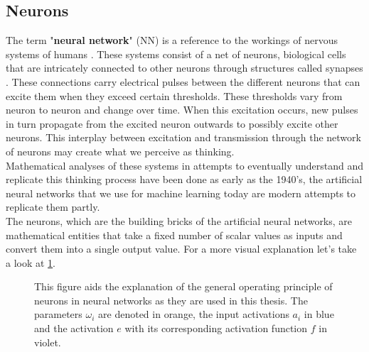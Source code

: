 \subsection{Neurons}
The term "\textbf{neural network}" (NN) is a reference to the workings of nervous systems of humans \cite{NeuralNetworkLiteratureReview}. These systems consist of a net of neurons, biological cells that are intricately connected to other neurons through structures called synapses \cite{PrinciplesOfBrainFunctioningHaken}. These connections carry electrical pulses between the different neurons that can excite them when they exceed certain thresholds. These thresholds vary from neuron to neuron and change over time. When this excitation occurs, new pulses in turn propagate from the excited neuron outwards to possibly excite other neurons. This interplay between excitation and transmission through the network of neurons may create what we perceive as thinking.\\
Mathematical analyses of these systems in attempts to eventually understand and replicate this thinking process have been done as early as the 1940's\cite{A_logical_calculus_of_the_ideas_immanent_in_nervous_activity}, the artificial neural networks that we use for machine learning today are modern attempts to replicate them partly.\\
The neurons, which are the building bricks of the artificial neural networks, are mathematical entities that take a fixed number of scalar values as inputs and convert them into a single output value. For a more visual explanation let's take a look at \cref{fig:Neuron_explanation}.
\begin{figure}
	\centering
	
	\caption{This figure aids the explanation of the general operating principle of neurons in neural networks as they are used in this thesis. The parameters $\omega_i$ are denoted in orange, the input activations $a_i$ in blue and the activation $e$ with its corresponding activation function $f$ in violet.}
	\label{fig:Neuron_explanation}
\end{figure}
